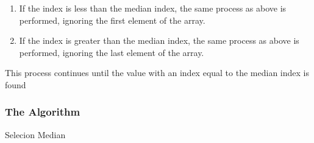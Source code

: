 \documentclass{article}
\begin{document}
        \begin{enumerate}
            \item If the index is less than the median index, the same process as above is performed, ignoring the first element of the array.
            \item If the index is greater than the median index, the same process as above is performed, ignoring the last element of the array.

        \end{enumerate}

        This process continues until the value with an index equal to the median index is found

        \subsubsection{The Algorithm}
            \begin{algorithm}[H]
                \caption{Selecion Median}
                \begin{algorithmic}[1]
                    \Function{Median}{$A[0..n - 1$}
                        \Else
                        \EndIf
                    \EndFunction\\

                        \EndIf
                        \EndIf
                        \EndIf
                    \EndFunction\\


                            \EndIf
                        \EndFor
                    \EndFunction
                \end{algorithmic}
            \end{algorithm}
\end{document}
